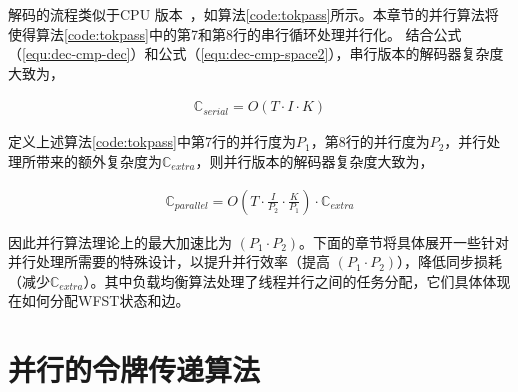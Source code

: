 解码的流程类似于CPU 版本~\cite{povey2011kaldi}，如算法\ref{code:tokpass}所示。本章节的并行算法将使得算法\ref{code:tokpass}中的第7和第8行的串行循环处理并行化。
结合公式（\ref{equ:dec-cmp-dec}）和公式（\ref{equ:dec-cmp-space2}），串行版本的解码器复杂度大致为，

\begin{equation}
\label{equ:dec-cmp-serial}
 \begin{split}
\mathbb{C}_{serial} = O(T\cdot I \cdot K)
 \end{split}
\end{equation}

定义上述算法\ref{code:tokpass}中第7行的并行度为$P_1$，第8行的并行度为$P_2$，并行处理所带来的额外复杂度为$\mathbb{C}_{extra} $，则并行版本的解码器复杂度大致为，

\begin{equation}
\label{equ:dec-cmp-parallel}
 \begin{split}
\mathbb{C}_{parallel} = O(T\cdot \frac{I}{P_2} \cdot \frac{K}{P_1})\cdot \mathbb{C}_{extra}
 \end{split}
\end{equation}

因此并行算法理论上的最大加速比为 $(P_1 \cdot P_2)$。下面的章节将具体展开一些针对并行处理所需要的特殊设计，以提升并行效率（提高 $(P_1 \cdot P_2)$），降低同步损耗（减少$\mathbb{C}_{extra}$）。其中负载均衡算法处理了线程并行之间的任务分配，它们具体体现在如何分配WFST状态和边。

\section{并行的令牌传递算法}
\label{sec:atomic}

